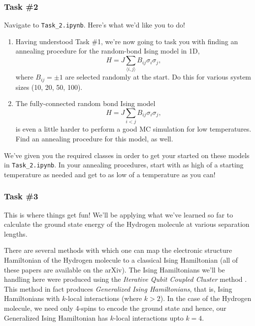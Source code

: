 \documentclass[12pt]{article}
\begin{document}
\subsubsection*{Task \#2}
Navigate to \texttt{Task\_2.ipynb}. Here's what we'd like you to do!
\begin{enumerate}
    \item Having understood Task \#1, we're now going to task you with finding an annealing procedure for the random-bond Ising model in 1D,
    \begin{equation}
        H = J\sum_{\langle i,j \rangle} B_{ij}\sigma_i\sigma_j,
    \end{equation}
    where $B_{ij} = \pm 1$ are selected randomly at the start. Do this for various system sizes (10, 20, 50, 100).
    \item The fully-connected random bond Ising model
    \begin{equation}
        H = J \sum_{i < j} B_{ij}\sigma_i\sigma_j,
    \end{equation}
    is even a little harder to perform a good MC simulation for low temperatures. Find an annealing procedure for this model, as well.
\end{enumerate}
We've given you the required classes in order to get your started on these models in \texttt{Task\_2.ipynb}. In your annealing procedures, start with as high of a starting temperature as needed and get to as low of a temperature as you can!

\subsubsection*{Task \#3}
This is where things get fun!
We'll be applying what we've learned so far to calculate the ground state energy
of the Hydrogen molecule at various separation lengths.

There are several methods with which one can map the electronic structure Hamiltonian
of the Hydrogen molecule to a classical Ising Hamiltonian
\cite{iqcc,qcc,xia2016electronic,xia2017electronic} (all of these papers are available on the arXiv).
The Ising Hamiltonians we'll be handling here were produced using the
\textit{Iterative Qubit Coupled Cluster} method \cite{iqcc}. This method
in fact produces \textit{Generalized Ising Hamiltonians}, that is, Ising
Hamiltonians with $k$-local interactions (where $k > 2$).
In the case of the Hydrogen molecule, we need only 4-spins to encode the ground state and
hence, our Generalized Ising Hamiltonian has $k$-local interactions upto $k=4$.
\end{document}
